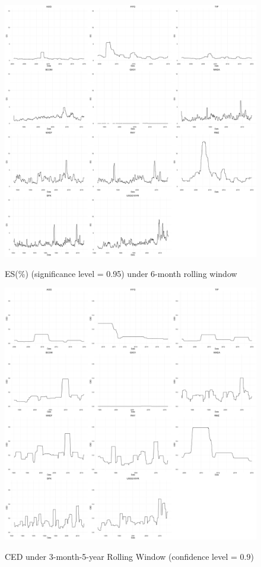 \documentclass[12pt]{article}
\begin{document}
\begin{figure}[h]
\caption{ES(\%) (significance level = 0.95) under 6-month rolling window} 
\centering 
\includegraphics[width=15cm]{../figures/rolling_stats/ES6mon_scaled}
\label{fig: ES6mon}
\end{figure}

\begin{figure}[h]
\caption{CED under 3-month-5-year Rolling Window (confidence level = 0.9)} 
\centering 
\includegraphics[width=15cm]{../figures/rolling_stats/CED3mon2yr_scaled}
\label{fig: CED3mon2yr}
\end{figure}
\end{document}

